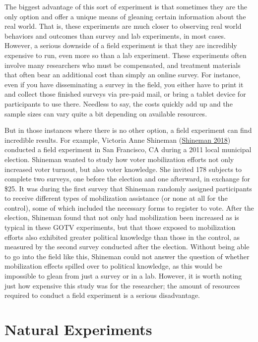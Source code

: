 \documentclass{book}
\begin{document}
The biggest advantage of this sort of experiment is that sometimes they are
the only option and offer a unique means of gleaning certain information about
the real world. That is, these experiments are much closer to observing real
world behaviors and outcomes than survey and lab experiments, in most cases.
However, a serious downside of a field experiment is that they are incredibly
expensive to run, even more so than a lab experiment. These experiments often
involve many researchers who must be compensated, and treatment materials that
often bear an additional cost than simply an online survey. For instance, even
if you have disseminating a survey in the field, you either have to print it
and collect those finished surveys via pre-paid mail, or bring a tablet device
for participants to use there. Needless to say, the costs quickly add up and
the sample sizes can vary quite a bit depending on available resources.

But in those instances where there is no other option, a field experiment can
find incredible results. For example, Victoria Anne Shineman
(\protect\hyperlink{ref-shineman_if_2018}{Shineman 2018}) conducted a field
experiment in San Francisco, CA during a 2011 local municipal election.
Shineman wanted to study how voter mobilization efforts not only increased
voter turnout, but also voter knowledge. She invited 178 subjects to complete
two surveys, one before the election and one afterward, in exchange for \$25.
It was during the first survey that Shineman randomly assigned participants to
receive different types of mobilization assistance (or none at all for the
control), some of which included the necessary forms to register to vote.
After the election, Shineman found that not only had mobilization been
increased as is typical in these GOTV experiments, but that those exposed to
mobilization efforts also exhibited greater political knowledge than those in
the control, as measured by the second survey conducted after the election.
Without being able to go into the field like this, Shineman could not answer
the question of whether mobilization effects spilled over to political
knowledge, as this would be impossible to glean from just a survey or in a
lab. However, it is worth noting just how expensive this study was for the
researcher; the amount of resources required to conduct a field experiment is
a serious disadvantage.

\hypertarget{natural-experiments}{%
\section{Natural Experiments}\label{natural-experiments}}
\end{document}
